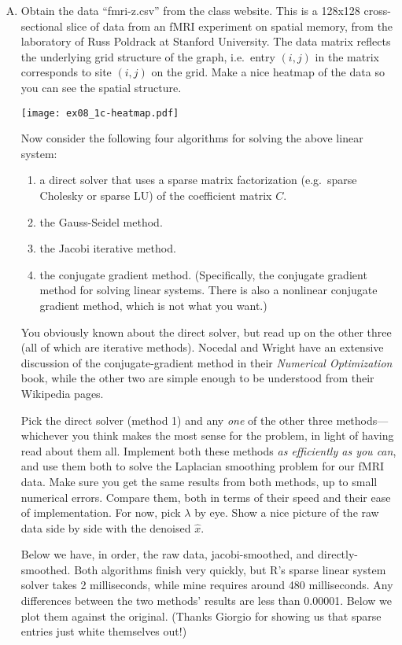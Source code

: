\documentclass{article}
\begin{document}
\begin{enumerate}[(A)]
\item Obtain the data ``fmri-z.csv'' from the class website.  This is a 128x128 cross-sectional slice of data from an fMRI experiment on spatial memory, from the laboratory of Russ Poldrack at Stanford University.  The data matrix reflects the underlying grid structure of the graph, i.e.~entry $(i,j)$ in the matrix corresponds to site $(i,j)$ on the grid.  Make a nice heatmap of the data so you can see the spatial structure.

\color{blue}
\begin{center}
\texttt{[image: ex08\_1c-heatmap.pdf]}
\end{center}
\color{black}

Now consider the following four algorithms for solving the above linear system:
\begin{enumerate}[1.]
\item a direct solver that uses a sparse matrix factorization (e.g.~sparse Cholesky or sparse LU) of the coefficient matrix $C$.
\item the Gauss-Seidel method.
\item the Jacobi iterative method.
\item the conjugate gradient method.  (Specifically, the conjugate gradient method for solving linear systems.  There is also a nonlinear conjugate gradient method, which is not what you want.)
\end{enumerate}

You obviously known about the direct solver, but read up on the other three (all of which are iterative methods).  Nocedal and Wright have an extensive discussion of the conjugate-gradient method in their \textit{Numerical Optimization} book, while the other two are simple enough to be understood from their Wikipedia pages.

Pick the direct solver (method 1) and any \textit{one} of the other three methods---whichever you think makes the most sense for the problem, in light of having read about them all.  Implement both these methods \textit{as efficiently as you can}, and use them both to solve the Laplacian smoothing problem for our fMRI data.  Make sure you get the same results from both methods, up to small numerical errors.  Compare them, both in terms of their speed and their ease of implementation.  For now, pick $\lambda$ by eye.  Show a nice picture of the raw data side by side with the denoised $\hat{x}$.

\color{blue}
Below we have, in order, the raw data, jacobi-smoothed, and directly-smoothed. Both algorithms finish very quickly, but R's sparse linear system solver takes 2 milliseconds, while mine requires around 480 milliseconds.  Any differences between the two methods' results are less than 0.00001. Below we plot them against the original. (Thanks Giorgio for showing us that sparse entries just white themselves out!)


\end{enumerate}
\end{document}
